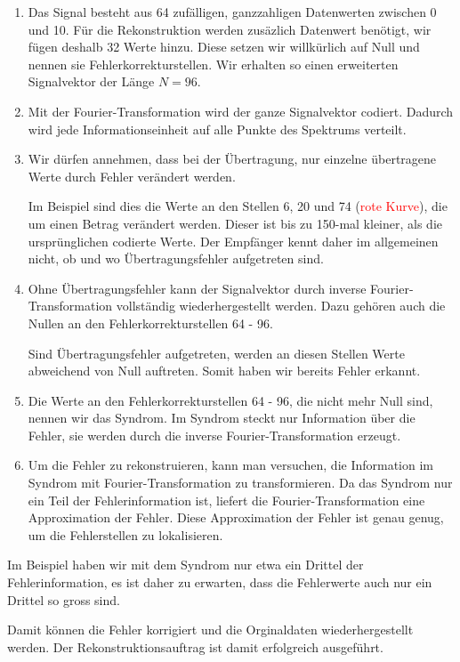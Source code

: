 \begin{enumerate}[(1)]
 \item Das Signal besteht aus 64 zufälligen, ganzzahligen Datenwerten zwischen 0 und 10.
 Für die Rekonstruktion werden zusäzlich Datenwert benötigt, wir fügen deshalb 32 Werte hinzu.
 Diese setzen wir willkürlich auf Null und nennen sie Fehlerkorrekturstellen.
 Wir erhalten so einen erweiterten Signalvektor der Länge $N =96$.
 \item Mit der Fourier-Transformation wird der ganze Signalvektor codiert.
 Dadurch wird jede Informationseinheit auf alle Punkte des Spektrums verteilt.
 \item Wir dürfen annehmen, dass bei der Übertragung, nur einzelne übertragene 
 	Werte durch Fehler verändert werden.
 \par 
 Im Beispiel sind dies die Werte an den Stellen 6, 20 und 74 (\textcolor{red}{rote Kurve}),
 	die um einen Betrag verändert werden.
 Dieser ist bis zu 150-mal kleiner, als die ursprünglichen codierte Werte. 
 Der Empfänger kennt daher im allgemeinen nicht, ob und wo Übertragungsfehler aufgetreten sind.
 \item Ohne Übertragungsfehler kann der Signalvektor durch inverse Fourier-Transformation vollständig
 	wiederhergestellt werden.
 Dazu gehören auch die Nullen an den Fehlerkorrekturstellen 64 - 96.
 \par 
 Sind Übertragungsfehler aufgetreten, werden an diesen Stellen Werte abweichend von Null auftreten.
 Somit haben wir bereits Fehler erkannt.
 \item Die Werte an den Fehlerkorrekturstellen 64 - 96, die nicht mehr Null sind, nennen wir das Syndrom.
 Im Syndrom steckt nur Information über die Fehler, sie werden durch die inverse Fourier-Transformation erzeugt.
 \item Um die Fehler zu rekonstruieren, kann man versuchen, die Information im Syndrom mit Fourier-Transformation zu transformieren.
 Da das Syndrom nur ein Teil der Fehlerinformation ist, liefert die Fourier-Transformation eine Approximation der Fehler.
 Diese Approximation der Fehler ist genau genug, um die Fehlerstellen zu lokalisieren.
\end{enumerate}
Im Beispiel haben wir mit dem Syndrom nur etwa ein Drittel der Fehlerinformation, es ist daher zu erwarten, 
dass die Fehlerwerte auch nur ein Drittel so gross sind.
\par 
Damit können die Fehler korrigiert und die Orginaldaten wiederhergestellt werden.
Der Rekonstruktionsauftrag ist damit erfolgreich ausgeführt.

